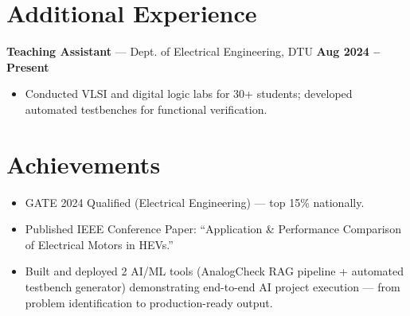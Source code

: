 \documentclass[9pt,a4paper]{extarticle}
\begin{document}
\section{Additional Experience}

\noindent\textbf{Teaching Assistant} --- Dept. of Electrical Engineering, DTU \hfill\textbf{Aug 2024 -- Present}
\begin{itemize}
  \item Conducted VLSI and digital logic labs for 30+ students; developed automated testbenches for functional verification.
\end{itemize}

\section{Achievements}
\begin{itemize}
  \item GATE 2024 Qualified (Electrical Engineering) --- top 15\% nationally.
  \item Published IEEE Conference Paper: ``Application \& Performance Comparison of Electrical Motors in HEVs.''
  \item Built and deployed 2 AI/ML tools (AnalogCheck RAG pipeline + automated testbench generator) demonstrating end-to-end AI project execution --- from problem identification to production-ready output.
\end{itemize}
\end{document}
